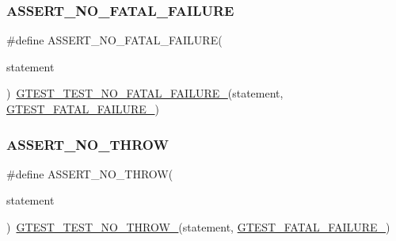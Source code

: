 \subsubsection{\texorpdfstring{ASSERT\_NO\_FATAL\_FAILURE}{ASSERT\_NO\_FATAL\_FAILURE}}
{\footnotesize\ttfamily \#define A\+S\+S\+E\+R\+T\+\_\+\+N\+O\+\_\+\+F\+A\+T\+A\+L\+\_\+\+F\+A\+I\+L\+U\+RE(\begin{DoxyParamCaption}\item[{}]{statement }\end{DoxyParamCaption})~\mbox{\hyperlink{_obj__test_2lib_2googletest-release-1_88_81_2googletest_2include_2gtest_2internal_2gtest-internal_8h_a1b37a3c446836d33040f3266a6236081}{G\+T\+E\+S\+T\+\_\+\+T\+E\+S\+T\+\_\+\+N\+O\+\_\+\+F\+A\+T\+A\+L\+\_\+\+F\+A\+I\+L\+U\+R\+E\+\_\+}}(statement, \mbox{\hyperlink{_obj__test_2lib_2googletest-release-1_88_81_2googletest_2include_2gtest_2internal_2gtest-internal_8h_a0f9a4c3ea82cc7bf4478eaffdc168358}{G\+T\+E\+S\+T\+\_\+\+F\+A\+T\+A\+L\+\_\+\+F\+A\+I\+L\+U\+R\+E\+\_\+}})}

\mbox{\label{_obj__test_2lib_2googletest-master_2googletest_2include_2gtest_2gtest_8h_a895c34d9b192cdc2ba46d2680623485d}} 
\subsubsection{\texorpdfstring{ASSERT\_NO\_THROW}{ASSERT\_NO\_THROW}}
{\footnotesize\ttfamily \#define A\+S\+S\+E\+R\+T\+\_\+\+N\+O\+\_\+\+T\+H\+R\+OW(\begin{DoxyParamCaption}\item[{}]{statement }\end{DoxyParamCaption})~\mbox{\hyperlink{_obj__test_2lib_2googletest-release-1_88_81_2googletest_2include_2gtest_2internal_2gtest-internal_8h_a9a109d026b5a904646437d7570e13581}{G\+T\+E\+S\+T\+\_\+\+T\+E\+S\+T\+\_\+\+N\+O\+\_\+\+T\+H\+R\+O\+W\+\_\+}}(statement, \mbox{\hyperlink{_obj__test_2lib_2googletest-release-1_88_81_2googletest_2include_2gtest_2internal_2gtest-internal_8h_a0f9a4c3ea82cc7bf4478eaffdc168358}{G\+T\+E\+S\+T\+\_\+\+F\+A\+T\+A\+L\+\_\+\+F\+A\+I\+L\+U\+R\+E\+\_\+}})}

\mbox{\label{_obj__test_2lib_2googletest-master_2googletest_2include_2gtest_2gtest_8h_a58847dd696200a3268361401dfcd0fa0}} 
